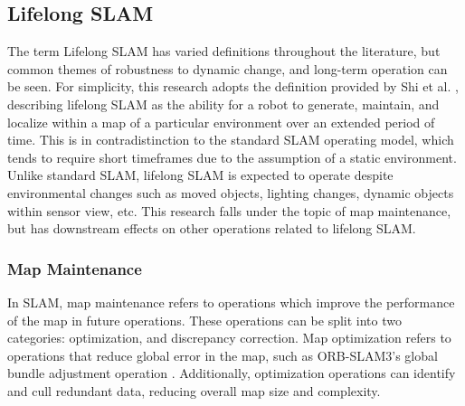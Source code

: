 \subsection{Lifelong SLAM}

The term Lifelong SLAM has varied definitions throughout the literature, but common themes of robustness to dynamic change, and long-term operation can be seen. For simplicity, this research adopts the definition provided by Shi et al. \cite{shiAreWeReady2020}, describing lifelong SLAM as the ability for a robot to generate, maintain, and localize within a map of a particular environment over an extended period of time. This is in contradistinction to the standard SLAM operating model, which tends to require short timeframes due to the assumption of a static environment. Unlike standard SLAM, lifelong SLAM is expected to operate despite environmental changes such as moved objects, lighting changes, dynamic objects within sensor view, etc. This research falls under the topic of map maintenance, but has downstream effects on other operations related to lifelong SLAM.

\subsubsection{Map Maintenance}

In SLAM, map maintenance refers to operations which improve the performance of the map in future operations. These operations can be split into two categories: optimization, and discrepancy correction. Map optimization refers to operations that reduce global error in the map, such as ORB-SLAM3's global bundle adjustment operation \cite{camposORBSLAM3AccurateOpenSource2021}. Additionally, optimization operations can identify and cull redundant data, reducing overall map size and complexity. 